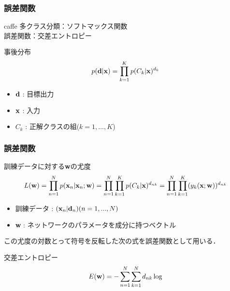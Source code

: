 \documentclass[dvipdfmx,11pt,notheorems]{beamer}
\theoremstyle{definition}
\begin{document}
\begin{frame}[fragile]\frametitle{誤差関数}
 \begin{block}{caffe}
 多クラス分類：ソフトマックス関数\\
 誤差関数：交差エントロピー
 \end{block}
 
 \begin{exampleblock}{事後分布}
  \begin{equation}
   p({\bf d}|{\bf x}) = \prod_{k=1}^{K}p(C_k|{\bf x})^{d_k}
  \end{equation}
 \end{exampleblock}

 \begin{itemize}
	\item ${\bf d}$ : 目標出力
	\item ${\bf x}$ : 入力
	\item $C_k$ : 正解クラスの組($k=1,...,K$) 
 \end{itemize}

\end{frame}

\begin{frame}[fragile]\frametitle{誤差関数}
 
 \begin{exampleblock}{訓練データに対する{\bf w}の尤度}
  \begin{equation}
    L({\bf w})=\prod_{n=1}^{N}p({\bf x}_n|{\bf x}_n;{\bf
	w})=\prod_{n=1}^{N}\prod_{k=1}^{K}p(C_k|{\bf
	x})^{d_{nk}}=\prod_{n=1}^{N}\prod_{k=1}^{K}(y_k({\bf x};{\bf w}))^{d_{nk}}
  \end{equation}
 \end{exampleblock}
 
 \begin{itemize}
	\item 訓練データ : ${({\bf x}_n|{\bf d}_n)}(n=1,...,N)$
	\item {\bf w} : ネットワークのパラメータを成分に持つベクトル
 \end{itemize}
 
この尤度の対数とって符号を反転した次の式を誤差関数として用いる．

 \begin{exampleblock}{交差エントロピー}
  \begin{equation}
   E({\bf w})=-\sum^{N}_{n=1}\sum^{N}_{k=1}d_{nk}\log
  \end{equation}
 \end{exampleblock}

\end{frame}
\end{document}
